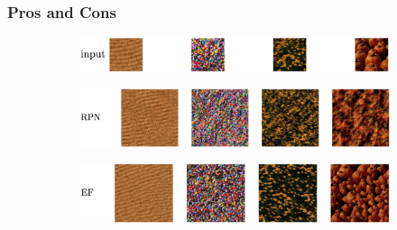 \subsubsection{Pros and Cons}
\label{section:background-texture_synthesis-statistics_based-pros_and_cons}

\begin{figure}[ht]
    \centering
    \begin{subfigure}[b]{0.8\textwidth}
        \centering
        \includegraphics[width=\textwidth]{images/02-big_comparison_input_compressed.jpg}
        \caption*{}
    \end{subfigure}
    
    \begin{subfigure}[b]{\textwidth}
        \centering
        \includegraphics[width=\textwidth]{images/02-big_comparison_rpn_compressed.jpg}
        \caption*{}
    \end{subfigure}
    
    \begin{subfigure}[b]{\textwidth}
        \centering
        \includegraphics[width=\textwidth]{images/02-big_comparison_quilting_compressed.jpg}
        \caption*{}
    \end{subfigure}


\end{figure}

